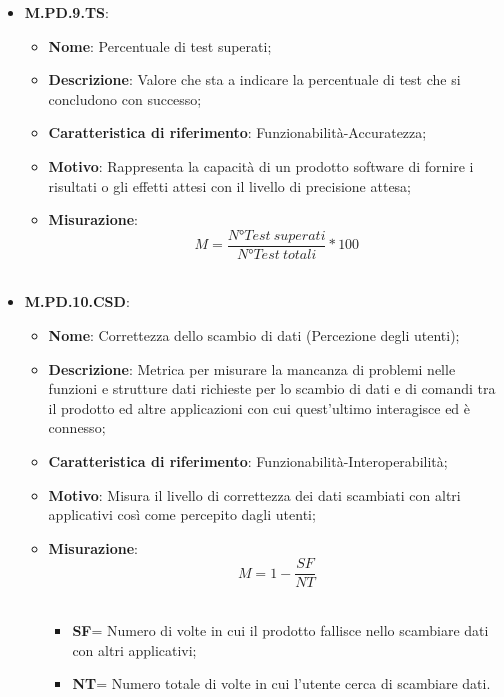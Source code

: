 \documentclass[10pt, a4paper]{article}
\begin{document}
\begin{itemize}
     \item \textbf{M.PD.9.TS}: 
    \begin{itemize}
        \item \textbf{Nome}: Percentuale di test superati;
        \item \textbf{Descrizione}: Valore che sta a indicare la percentuale di test che si concludono con successo;
        \item \textbf{Caratteristica di riferimento}: Funzionabilità-Accuratezza;
        \item \textbf{Motivo}: Rappresenta la capacità di un prodotto software di fornire i risultati o gli effetti attesi con il livello di precisione attesa;
       \item \textbf{Misurazione}: \[M=\frac{N° Test \ superati}{N° Test \ totali} * 100 \] \\
       \end{itemize}



    \item \textbf{M.PD.10.CSD}:
    \begin{itemize}
        \item \textbf{Nome}: Correttezza dello scambio di dati (Percezione degli utenti);
        \item \textbf{Descrizione}: Metrica per misurare la mancanza di problemi nelle funzioni e strutture dati richieste per lo scambio di dati e di comandi tra il prodotto ed altre applicazioni con cui quest'ultimo interagisce ed è connesso;
        \item \textbf{Caratteristica di riferimento}: Funzionabilità-Interoperabilità;
        \item \textbf{Motivo}: Misura il livello di correttezza dei dati scambiati con altri applicativi così come percepito dagli utenti; 
       \item \textbf{Misurazione}:   \[M= 1-\frac{SF}{NT} \] \\
       \begin{itemize}
           \item \textbf{SF}= Numero di volte in cui il prodotto fallisce nello scambiare dati con altri applicativi;
           \item \textbf{NT}= Numero totale di volte in cui l'utente cerca di scambiare dati.\\
       \end{itemize}
    \end{itemize}


\end{itemize}
\end{document}
